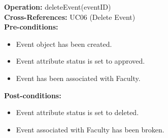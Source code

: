 \documentclass{article}
\begin{document}
\textbf{Operation:} deleteEvent(eventID) \\
\textbf{Cross-References:} UC06 (Delete Event) \\
\textbf{Pre-conditions:}
\begin{itemize}
    \item Event object has been created.
    \item Event attribute status is set to approved.
    \item Event has been associated with Faculty.
\end{itemize}
\textbf{Post-conditions:}
\begin{itemize}
    \item Event attribute status is set to deleted.
    \item Event associated with Faculty has been broken.
\end{itemize}
\end{document}
